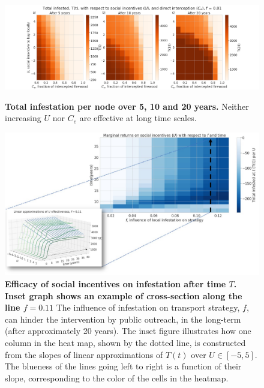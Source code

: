 \begin{figure}[!h]
 \centering
\includegraphics[width  =\textwidth]{chapter_2/ct_v_ce_plane.png}
\caption{\textbf{Total infestation per node over 5, 10 and 20 years.} Neither increasing $U$ nor $C_e$ are effective at long time scales.}
\protect \label{ct_v_ce}
\end{figure}



\begin{figure}[!h]
    \centering
    \includegraphics[width = \textwidth]{chapter_2/p1.jpg}
    \caption{\textbf{Efficacy of social incentives on infestation after time $T$. Inset graph shows an example of cross-section along the line $f = 0.11$} The influence of infestation on transport strategy, $f$, can hinder the intervention by public outreach, in the long-term (after approximately 20 years). The inset figure illustrates how one column in the heat map, shown by the dotted line, is constructed from the slopes of linear approximations of $T(t)$ over $U\in [-5,5]$. The blueness of the lines going left to right is a function of their slope, corresponding to the color of the cells in the heatmap.}
    \label{effectiveness_inset}
\end{figure}

